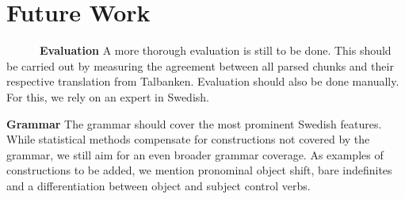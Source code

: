 \documentclass[runningheads,a4paper]{llncs}
\begin{document}
%



\section{Future Work}

~~~~~~\textbf{Evaluation}
A more thorough evaluation is still to be done. This should be carried out by
measuring the agreement between all parsed chunks and their respective
translation from Talbanken. Evaluation should also be done manually.
For this, we rely on an expert in Swedish.

 
\textbf{Grammar}
The grammar should cover the most prominent Swedish features.
While statistical methods compensate for constructions not covered by
the grammar, we still aim for an even broader grammar coverage. 
As examples of constructions to be added, we mention
pronominal object shift, bare indefinites and a differentiation between
object and subject control verbs.
%
%
\end{document}
